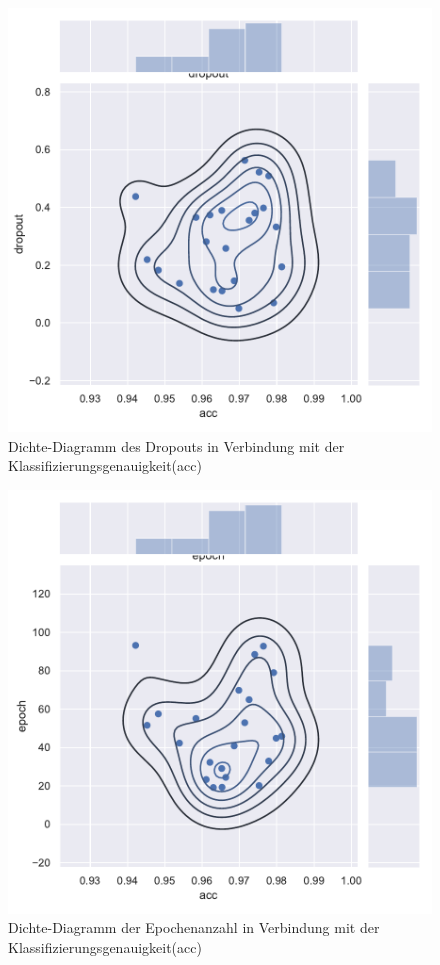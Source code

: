\begin{figure}[H]
  \centering  
  \includegraphics[scale=0.5]{anhang/GA_50_mnist_digits_False_small_jointplot_dropout.pdf}
  \caption{Dichte-Diagramm des Dropouts in Verbindung mit der Klassifizierungsgenauigkeit(acc)}
  
\end{figure}

\begin{figure}[H]
  \centering  
  \includegraphics[scale=0.5]{anhang/GA_50_mnist_digits_False_small_jointplot_epoch.pdf}
  \caption{Dichte-Diagramm der Epochenanzahl in Verbindung mit der Klassifizierungsgenauigkeit(acc)}
  
\end{figure}

